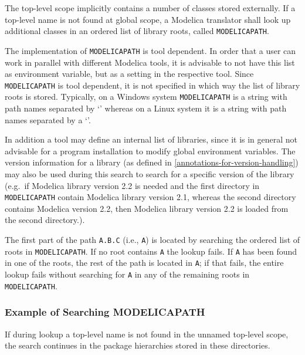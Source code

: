 The top-level scope implicitly contains a number of classes stored
externally. If a top-level name is not found at global scope, a Modelica
translator shall look up additional classes in an ordered list of
library roots, called \lstinline!MODELICAPATH!.

\begin{nonnormative}
The implementation of \lstinline!MODELICAPATH! is tool dependent.  In order that a user can work in parallel with different Modelica tools, it is advisable to not
have this list as environment variable, but as a setting in the respective tool.  Since \lstinline!MODELICAPATH! is tool dependent, it is not specified in which way
the list of library roots is stored.  Typically, on a Windows system \lstinline!MODELICAPATH! is a string with path names separated by `\filename{;}' whereas on a Linux system
it is a string with path names separated by a `\filename{:}'.
\end{nonnormative}

In addition a tool may define an internal list of libraries, since it is
in general not advisable for a program installation to modify global
environment variables. The version information for a library (as defined
in \autoref{annotations-for-version-handling}) may also be used during this search to search for a
specific version of the library (e.g.\ if Modelica library version 2.2 is
needed and the first directory in \lstinline!MODELICAPATH! contain Modelica library
version 2.1, whereas the second directory contains Modelica version 2.2,
then Modelica library version 2.2 is loaded from the second directory.).

\begin{nonnormative}
The first part of the path \lstinline!A.B.C! (i.e., \lstinline!A!) is located by searching the ordered list of roots in \lstinline!MODELICAPATH!.  If no root contains
\lstinline!A! the lookup fails.  If \lstinline!A! has been found in one of the roots, the rest of the path is located in \lstinline!A!; if that fails, the entire lookup
fails without searching for \lstinline!A! in any of the remaining roots in \lstinline!MODELICAPATH!.
\end{nonnormative}

\subsubsection{Example of Searching MODELICAPATH}

If during lookup a top-level name is not found in the unnamed top-level
scope, the search continues in the package hierarchies stored in these
directories.

